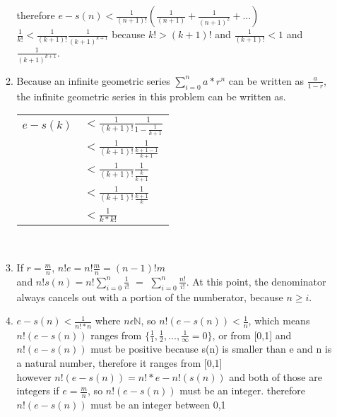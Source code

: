 \documentclass{article}
\begin{document}
\begin{enumerate}
\begin{enumerate}
					therefore $e-s(n) < \frac{1}{(n+1)!}(\frac{1}{(n+1)} + \frac{1}{(n+1)^2} + ... )$\\	
					$\frac{1}{k!} < \frac{1}{(k+1)!} \frac{1}{(k+1)^{k+1}}$ because $k! > (k+1)!$ and $\frac{1}{(k+1)!} < 1$ and $\frac{1}{(k+1)^{k+1}}$.\\
				\item
					Because an infinite geometric series $\sum\limits_{i=0}^{n}a*r^n$ can be written as $\frac{a}{1-r}$, the infinite geometric series in this problem can be written as.\\
					\begin{tabular}{l l}
						$e - s(k)$ & $< \frac{1}{(k+1)!}\frac{1}{1-\frac{1}{k+1}}$\\
						& $< \frac{1}{(k+1)!}\frac{1}{\frac{k+1-1}{k+1}}$\\
						& $< \frac{1}{(k+1)!}\frac{1}{\frac{k}{k+1}}$\\
						& $< \frac{1}{(k+1)!}\frac{1}{\frac{k+1}{k}}$\\
						& $< \frac{1}{k*k!}$\\
					\end{tabular}\\
				\item
					If $r = \frac{m}{n}$,  $n! e = n! \frac{m}{n} = (n-1)! m$\\
					and $n! s(n) = n! \sum\limits_{i=0}^n \frac{1}{i!}$ $=$ $\sum\limits_{i=0}^n \frac{n!}{i!}$. At this point, the denominator always cancels out with a portion of the numberator, because $n \geq i$.
				\item $e-s(n) < \frac{1}{n!*n}$ where $n \epsilon \mathbb{N}$, so $n!(e-s(n)) < \frac{1}{n}$, which means $n!(e-s(n))$ ranges from $\{\frac{1}{1},\frac{1}{2}, ..., \frac{1}{\infty} = 0 \}$, or from [0,1] and $n!(e-s(n))$ must be positive because s(n) is smaller than e and n is a natural number, therefore it ranges from [0,1]\\
					however $n!(e-s(n)) = n!*e - n!(s(n))$ and both of those are integers if $e=\frac{m}{n}$, so $n!(e-s(n))$ must be an integer.
					therefore $n!(e-s(n))$ must be an integer between 0,1
			\end{enumerate}
	\end{enumerate}
\end{document}
